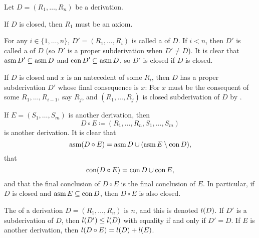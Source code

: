 \documentclass[a4paper, 11pt, article, danish, oneside]{memoir}
\newcommand*\union\cup
\newcommand{\defeq}{\coloneqq}
\begin{document}
\begin{remark}
    Let $D = (R_1, \ldots, R_n)$ be a derivation.
    \begin{enumrem}
        \item If $D$ is closed, then $R_1$ must be an axiom.
    
        \item\label{enum:subderivation} For any $i \in \{1, \ldots, n\}$, $D' = (R_1, \ldots, R_i)$ is called a  of $D$. If $i < n$, then $D'$ is called a  of $D$ (so $D'$ is a proper subderivation when $D' \neq D$). It is clear that $\operatorname{asm}D' \subseteq \operatorname{asm}D$ and $\operatorname{con}D' \subseteq \operatorname{asm}D$, so $D'$ is closed if $D$ is closed.
    
        \item\label{enum:derivation-antecedent} If $D$ is closed and $x$ is an antecedent of some $R_i$, then $D$ has a proper subderivation $D'$ whose final consequence is $x$: For $x$ must be the consequent of some $R_1, \ldots, R_{i-1}$, say $R_j$, and $(R_1, \ldots, R_j)$ is closed subderivation of $D$ by .

        \item\label{enum:derivation-composition} If $E = (S_1, \ldots, S_m)$ is another derivation, then
        \begin{equation*}
            D \circ E
                \defeq (R_1, \ldots, R_n, S_1, \ldots, S_m)
        \end{equation*}
        is another derivation. It is clear that
        \begin{equation*}
            \assum{(D \circ E)}
                = \assum{D} \union (\assum{E} \setminus \concl{D}),
        \end{equation*}
        that
        \begin{equation*}
            \concl{(D \circ E)}
                = \concl{D} \union \concl{E},
        \end{equation*}
        and that the final conclusion of $D \circ E$ is the final conclusion of $E$. In particular, if $D$ is closed and $\operatorname{asm}E \subseteq \operatorname{con}D$, then $D \circ E$ is also closed.

        \item The  of a derivation $D = (R_1, \ldots, R_n)$ is $n$, and this is denoted $l(D)$. If $D'$ is a subderivation of $D$, then $l(D') \leq l(D)$ with equality if and only if $D' = D$. If $E$ is another derivation, then $l(D \circ E) = l(D) + l(E)$.
    \end{enumrem}
\end{remark}
\end{document}
